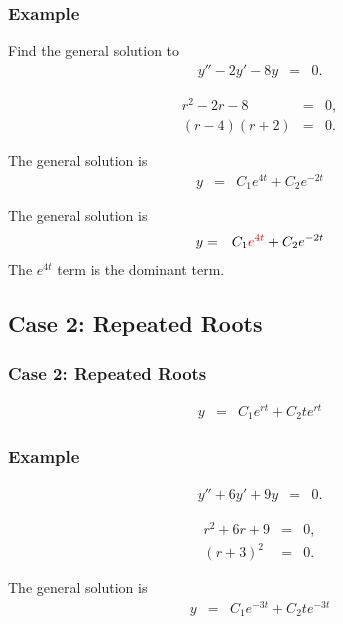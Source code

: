 \begin{frame}
  \frametitle{Example}

  Find the general solution to
  \begin{eqnarray*}
    y'' - 2y' - 8y & = & 0.
  \end{eqnarray*}

  {
    \begin{eqnarray*}
      r^2 - 2r - 8 & = & 0, \\
      (r-4)(r+2) & = & 0.
    \end{eqnarray*}
  }

  {
    The general solution is
    \begin{eqnarray*}
      y & = & C_1 e^{4t} + C_2 e^{-2t}
    \end{eqnarray*}

  }

  {
    The general solution is
    \begin{eqnarray*}
      y & = & C_1 {\color{red}e^{4t}} + C_2 e^{-2t}
    \end{eqnarray*}
    The $e^{4t}$ term is the dominant term.

  }


\end{frame}


\subsection{Case 2: Repeated Roots}

\begin{frame}
  \frametitle{Case 2: Repeated Roots}

  \begin{eqnarray*}
    y & = & C_1 e^{rt} + C_2 t e^{rt}
  \end{eqnarray*}


\end{frame}


\begin{frame}
  \frametitle{Example}

  \begin{eqnarray*}
    y'' + 6y' + 9y & = & 0.
  \end{eqnarray*}

  {
    \begin{eqnarray*}
      r^2 + 6r + 9 & = & 0, \\
      (r+3)^2 & = & 0.
    \end{eqnarray*}

    The general solution is
    \begin{eqnarray*}
      y & = & C_1 e^{-3t} + C_2 t e^{-3t}
    \end{eqnarray*}

  }

\end{frame}


